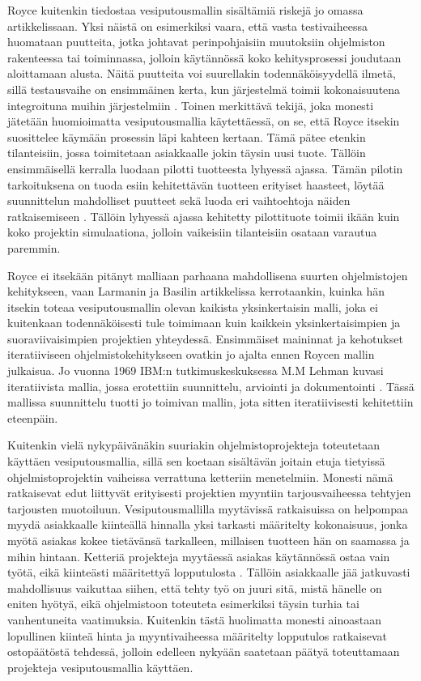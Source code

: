 \documentclass[finnish,nonumbib,nocopyright]{gradu2}
\begin{document}
Royce kuitenkin tiedostaa vesiputousmallin sisältämiä riskejä jo omassa artikkelissaan. Yksi näistä on esimerkiksi vaara, että vasta testivaiheessa huomataan puutteita, jotka johtavat perinpohjaisiin muutoksiin ohjelmiston rakenteessa tai toiminnassa, jolloin käytännössä koko kehitysprosessi joudutaan aloittamaan alusta. Näitä puutteita voi suurellakin todennäköisyydellä ilmetä, sillä testausvaihe on ensimmäinen kerta, kun järjestelmä toimii kokonaisuutena integroituna muihin järjestelmiin \cite{managing}. Toinen merkittävä tekijä, joka monesti jätetään huomioimatta vesiputousmallia käytettäessä, on se, että Royce itsekin suosittelee käymään prosessin läpi kahteen kertaan. Tämä pätee etenkin tilanteisiin, jossa toimitetaan asiakkaalle jokin täysin uusi tuote. Tällöin ensimmäisellä kerralla luodaan pilotti tuotteesta lyhyessä ajassa. Tämän pilotin tarkoituksena on tuoda esiin kehitettävän tuotteen erityiset haasteet, löytää suunnittelun mahdolliset puutteet sekä luoda eri vaihtoehtoja näiden ratkaisemiseen \cite{managing}. Tällöin lyhyessä ajassa kehitetty pilottituote toimii ikään kuin koko projektin simulaationa, jolloin vaikeisiin tilanteisiin osataan varautua paremmin.

Royce ei itsekään pitänyt malliaan parhaana mahdollisena suurten ohjelmistojen kehitykseen, vaan Larmanin ja Basilin artikkelissa \cite{iterative} kerrotaankin, kuinka hän itsekin toteaa vesiputousmallin olevan kaikista yksinkertaisin malli, joka ei kuitenkaan todennäköisesti tule toimimaan kuin kaikkein yksinkertaisimpien ja suoraviivaisimpien projektien yhteydessä. Ensimmäiset maininnat ja kehotukset iteratiiviseen ohjelmistokehitykseen ovatkin jo ajalta ennen Roycen mallin julkaisua. Jo vuonna 1969 IBM:n tutkimuskeskuksessa M.M Lehman kuvasi iteratiivista mallia, jossa erotettiin suunnittelu, arviointi ja dokumentointi \cite{iterative}. Tässä mallissa suunnittelu tuotti jo toimivan mallin, jota sitten iteratiivisesti kehitettiin eteenpäin.

Kuitenkin vielä nykypäivänäkin suuriakin ohjelmistoprojekteja toteutetaan käyttäen vesiputousmallia, sillä sen koetaan sisältävän joitain etuja tietyissä ohjelmistoprojektin vaiheissa verrattuna ketteriin menetelmiin. Monesti nämä ratkaisevat edut liittyvät erityisesti projektien myyntiin tarjousvaiheessa tehtyjen tarjousten muotoiluun. Vesiputousmallilla myytävissä ratkaisuissa on helpompaa myydä asiakkaalle kiinteällä hinnalla yksi tarkasti määritelty kokonaisuus, jonka myötä asiakas kokee tietävänsä tarkalleen, millaisen tuotteen hän on saamassa ja mihin hintaan. Ketteriä projekteja myytäessä asiakas käytännössä ostaa vain työtä, eikä kiinteästi määritettyä lopputulosta \cite{valtiokonttori}. Tällöin asiakkaalle jää jatkuvasti mahdollisuus vaikuttaa siihen, että tehty työ on juuri sitä, mistä hänelle on eniten hyötyä, eikä ohjelmistoon toteuteta esimerkiksi täysin turhia tai vanhentuneita vaatimuksia. Kuitenkin tästä huolimatta monesti ainoastaan lopullinen kiinteä hinta ja myyntivaiheessa määritelty lopputulos ratkaisevat ostopäätöstä tehdessä, jolloin edelleen nykyään saatetaan päätyä toteuttamaan projekteja vesiputousmallia käyttäen.
\end{document}
